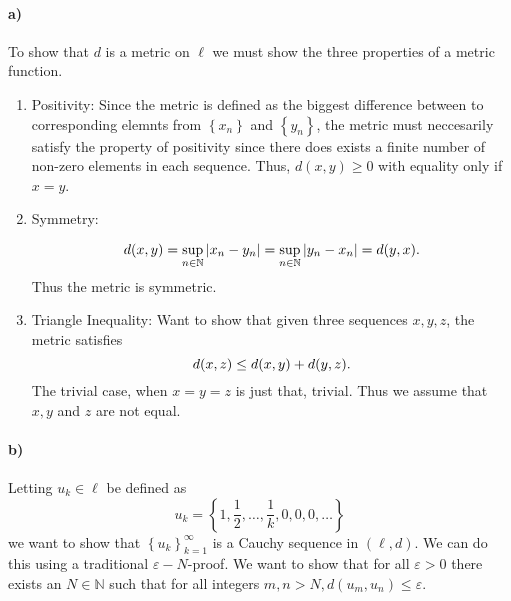 \documentclass[a4paper]{article}
\begin{document}
\paragraph{a)}

To show that $d$ is a metric on $\ell$ we must show the three properties of a metric function.
\begin{enumerate}
  \item Positivity:
    Since the metric is defined as the biggest difference between to
    corresponding elemnts from $\left\{ x_n \right\}$ and $\left\{ y_n
    \right\}$, the metric must neccesarily satisfy the property of positivity
    since there does exists a finite number of non-zero elements in each sequence.
    Thus, $d(x, y) \geq 0$ with equality only if $x = y$. 
  \item Symmetry:
    
    \begin{equation}
      \notag
      d(x, y) = \sup_{n\in\mathbb{N}} |x_n - y_n| = \sup_{n\in\mathbb{N}}|y_n - x_n| = d(y, x).
    \end{equation}
    Thus the metric is symmetric.

  \item Triangle Inequality:
    Want to show that given three sequences $x, y, z$, the metric satisfies
    \begin{equation}
      \notag
      d(x, z) \leq d(x, y) + d(y, z).
    \end{equation}
    The trivial case, when $x = y = z$ is just that, trivial. Thus we assume
    that $x, y$ and $z$ are not equal.
        
\end{enumerate}

\paragraph{b)}

Letting $u_k \in \ell$ be defined as
\begin{equation}
  u_k = \left\{ 1, \frac{1}{2}, \dots, \frac{1}{k}, 0, 0, 0, \dots \right\}
\end{equation}
we want to show that $\left\{ u_k \right\}_{k=1}^{\infty}$ is a Cauchy sequence
in $(\ell, d)$. We can do this using a traditional $\varepsilon-N$-proof.
We want to show that for all $\varepsilon > 0$ there exists an $N \in \mathbb{N}$ such that
for all integers $m, n > N, d(u_m, u_n) \leq \varepsilon$.
\end{document}
